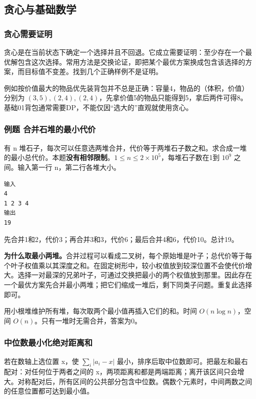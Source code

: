 \subsection{贪心与基础数学}
\subsubsection{贪心需要证明}
贪心是在当前状态下确定一个选择并且不回退。它成立需要证明：至少存在一个最优解包含这次选择。常用方法是交换论证，即把某个最优方案换成包含该选择的方案，而目标值不变差。找到几个正确样例不是证明。

例如按价值最大的物品优先装背包并不总是正确：容量4，物品的（体积，价值）分别为 $(3,5),(2,4),(2,4)$，先拿价值5的物品只能得到5，拿后两件可得8。基础01背包通常需要DP，不能仅因“选大的”直观就使用贪心。

\subsubsection{例题 合并石堆的最小代价}
有 n 堆石子，每次可以任意选两堆合并，代价等于两堆石子数之和。求合成一堆的最小总代价。本题\textbf{没有相邻限制}。$1\le n\le2\times10^5$，每堆石子数在1到 $10^9$ 之间。输入第一行 n，第二行各堆大小。
\begin{verbatim}
输入
4
1 2 3 4
输出
19
\end{verbatim}
先合并1和2，代价3；再合并3和3，代价6；最后合并4和6，代价10。总计19。

\textbf{为什么取最小两堆。}合并过程可以看成二叉树，每个原始堆是叶子；总代价等于每个叶子权值乘以其深度之和。在固定树形中，较小权值放到较深位置不会使代价增大。选择一对最深的兄弟叶子，可通过交换把最小的两个权值放到那里。因此存在一个最优方案先合并最小两堆；把它们缩成一堆后，剩下同类子问题。重复此选择即可。

用小根堆维护所有堆，每次取两个最小值再插入它们的和。时间 $O(n\log n)$，空间 $O(n)$。只有一堆时无需合并，答案为0。

\subsubsection{中位数最小化绝对距离和}
若在数轴上选位置 x，使 $\sum_i|a_i-x|$ 最小，排序后取中位数即可。把最左和最右配对：对任何位于两者之间的 x，两项距离和都是两端距离；离开该区间只会增大。对称配对后，所有区间的公共部分包含中位数。偶数个元素时，中间两数之间的任意位置都可达到最小值。

